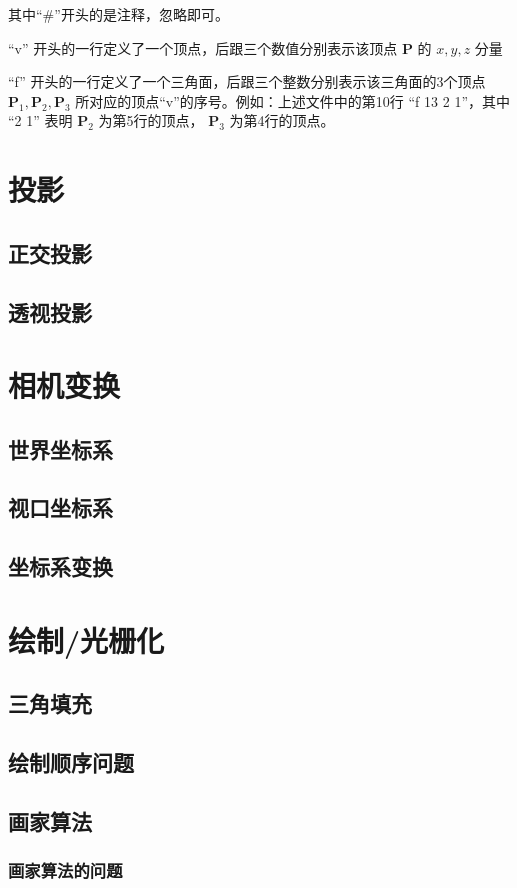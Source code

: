\documentclass[12pt,oneside,a4paper]{ctexart}
\begin{document}
其中“\#”开头的是注释，忽略即可。

“v” 开头的一行定义了一个顶点，后跟三个数值分别表示该顶点 $\mathbf{P}$ 的 $x, y, z$ 分量

“f” 开头的一行定义了一个三角面，后跟三个整数分别表示该三角面的3个顶点 $\mathbf{P}_1, \mathbf{P}_2, \mathbf{P}_3$ 所对应的顶点“v”的序号。例如：上述文件中的第10行 “f 13 2 1”，其中 “2 1” 表明 $\mathbf{P}_2$ 为第5行的顶点， $\mathbf{P}_3$ 为第4行的顶点。

\section{投影}
\subsection{正交投影}
\subsection{透视投影}
\section{相机变换}
\subsection{世界坐标系}
\subsection{视口坐标系}
\subsection{坐标系变换}
\section{绘制/光栅化}
\subsection{三角填充}
\subsection{绘制顺序问题}
\subsection{画家算法}
\subsubsection{画家算法的问题}
\end{document}
